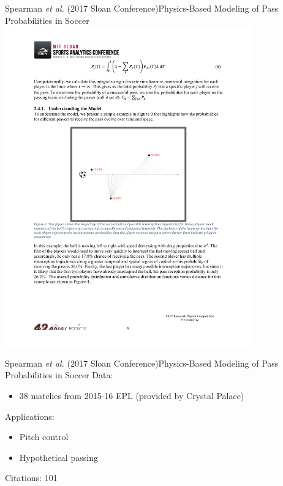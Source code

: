 \documentclass{beamer}
\begin{document}
  \begin{frame}{Spearman {\it et al.} (2017 Sloan Conference)}{Physics-Based Modeling of Pass Probabilities in Soccer}
    \centering
    \includegraphics[width = 0.8\textwidth]{images/spearman_etal_2017.pdf}
  \end{frame}

  \begin{frame}{Spearman {\it et al.} (2017 Sloan Conference)}{Physics-Based Modeling of Pass Probabilities in Soccer}
    Data:
    \begin{itemize}
      \item 38 matches from 2015-16 EPL (provided by Crystal Palace)
    \end{itemize}
    Applications:
    \begin{itemize}
      \item Pitch control
      \item Hypothetical passing
    \end{itemize}
    Citations: 101
  \end{frame}
\end{document}
